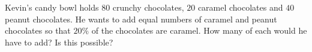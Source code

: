 Kevin's candy bowl holds $80$ crunchy chocolates, $20$ caramel chocolates and $40$ peanut chocolates. He wants to add equal numbers of caramel and peanut chocolates so that $20\%$ of the chocolates are caramel. How many of each would he have to add? Is this possible?
